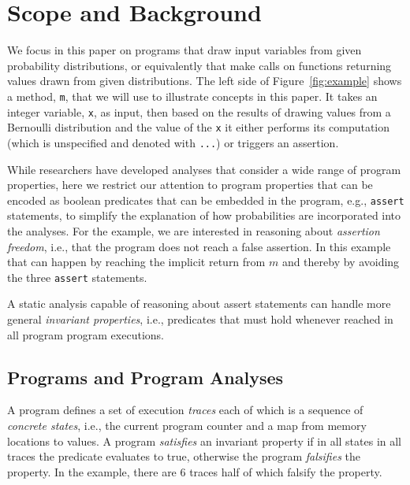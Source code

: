 \section{Scope and Background}
\label{sec:background}



We focus in this paper on programs that draw input variables
from given probability distributions, or equivalently that make
calls on functions returning values drawn from given distributions.
The left side of Figure~\ref{fig:example} shows a method,
\texttt{m}, that we will use to illustrate concepts in this paper.     
It takes an integer variable, \texttt{x}, as input, then based on the 
results of drawing values from a Bernoulli distribution
and the value of the \texttt{x} it either performs its computation
(which is unspecified and denoted with \texttt{...}) or triggers
an assertion. 

While researchers have developed analyses that consider a wide
range of program properties, here
we restrict our attention to program
properties that can be encoded as boolean predicates that
can be embedded in the program,
e.g., \texttt{assert} statements, to simplify the explanation
of how probabilities are incorporated into the analyses.
For the example, we are interested in reasoning about
\textit{assertion freedom}, i.e., that the program does
not reach a false assertion.
In this example
that can happen by reaching the implicit return from $m$
and thereby by avoiding the three \texttt{assert} statements.

A static analysis capable of reasoning about assert statements 
can handle more general \textit{invariant properties}, i.e., 
predicates that must hold whenever reached in all program program executions.  

\subsection{Programs and Program Analyses}
A program defines a set of execution \textit{traces} each of
which is a sequence of \textit{concrete states}, i.e., 
the current program counter and a map from memory locations to values.
A program \textit{satisfies} an invariant property if in all states in
all traces the predicate evaluates to true, otherwise the program
\textit{falsifies} the property.
In the example, there are 6 traces half of which falsify the property.

